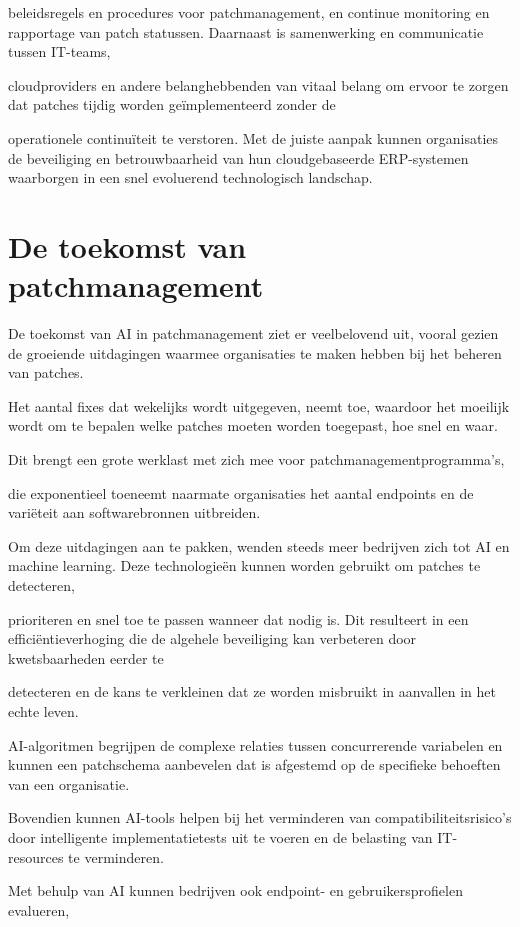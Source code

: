 beleidsregels en procedures voor patchmanagement, en continue monitoring en rapportage van patch statussen. Daarnaast is samenwerking en communicatie tussen IT-teams, 

cloudproviders en andere belanghebbenden van vitaal belang om ervoor te zorgen dat patches tijdig worden geïmplementeerd zonder de 

operationele continuïteit te verstoren. Met de juiste aanpak kunnen organisaties de beveiliging en betrouwbaarheid van hun cloudgebaseerde ERP-systemen waarborgen in een snel evoluerend technologisch landschap.


\section{De toekomst van patchmanagement}
De toekomst van AI in patchmanagement ziet er veelbelovend uit, vooral gezien de groeiende uitdagingen waarmee organisaties te maken hebben bij het beheren van patches.

Het aantal fixes dat wekelijks wordt uitgegeven, neemt toe, waardoor het moeilijk wordt om te bepalen welke patches moeten worden toegepast, hoe snel en waar. 

Dit brengt een grote werklast met zich mee voor patchmanagementprogramma's, 

die exponentieel toeneemt naarmate organisaties het aantal endpoints en de variëteit aan softwarebronnen uitbreiden.

Om deze uitdagingen aan te pakken, wenden steeds meer bedrijven zich tot AI en machine learning. Deze technologieën kunnen worden gebruikt om patches te detecteren, 

prioriteren en snel toe te passen wanneer dat nodig is. Dit resulteert in een efficiëntieverhoging die de algehele beveiliging kan verbeteren door kwetsbaarheden eerder te

detecteren en de kans te verkleinen dat ze worden misbruikt in aanvallen in het echte leven.

AI-algoritmen begrijpen de complexe relaties tussen concurrerende variabelen en kunnen een patchschema aanbevelen dat is afgestemd op de specifieke behoeften van een organisatie.

Bovendien kunnen AI-tools helpen bij het verminderen van compatibiliteitsrisico's door intelligente implementatietests uit te voeren en de belasting van IT-resources te verminderen.

Met behulp van AI kunnen bedrijven ook endpoint- en gebruikersprofielen evalueren, 


